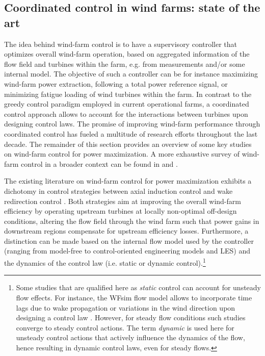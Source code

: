 \subsection{Coordinated control in wind farms: state of the art}
The idea behind wind-farm control is to have a supervisory controller that optimizes overall wind-farm operation, based on aggregated information of the flow field and turbines within the farm, e.g. from measurements and/or some internal model. The objective of such a controller can be for instance maximizing wind-farm power extraction, following a total power reference signal, or minimizing fatigue loading of wind turbines within the farm. In contrast to the greedy control paradigm employed in current operational farms, a coordinated control approach allows to account for the interactions between turbines upon designing control laws. The promise of improving wind-farm performance through coordinated control has fueled a multitude of research efforts throughout the last decade. The remainder of this section provides an overview of some key studies on wind-farm control for power maximization. A more exhaustive survey of wind-farm control in a broader context can be found in \cite{knudsen2015survey} and \cite{boersma2017tutorial}.

The existing literature on wind-farm control for power maximization exhibits a dichotomy in control strategies between axial induction control and wake redirection control \citep{boersma2017tutorial}. Both strategies aim at improving the overall wind-farm efficiency by operating upstream turbines at locally non-optimal off-design conditions, altering the flow field through the wind farm such that power gains in downstream regions compensate for upstream efficiency losses. Furthermore, a distinction can be made based on the internal flow model used by the controller (ranging from model-free to control-oriented engineering models and LES) and the dynamics of the control law (i.e. static or dynamic control).\footnote{Some studies that are qualified here as \emph{static} control can account for unsteady flow effects. For instance, the WFsim flow model allows to incorporate time lags due to wake propagation or variations in the wind direction upon designing a control law \citep{boersma2016control}. However, for steady flow conditions such studies converge to steady control actions. The term \emph{dynamic} is used here for unsteady control actions that actively influence the dynamics of the flow, hence resulting in dynamic control laws, even for steady flows.}


